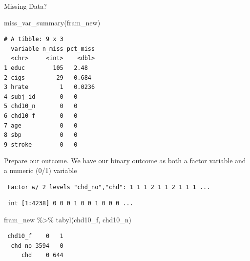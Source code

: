 \documentclass[
  ignorenonframetext,
]{beamer}
\newenvironment{Shaded}{\begin{snugshade}}{\end{snugshade}}
\newcommand{\FunctionTok}[1]{\textcolor[rgb]{0.00,0.00,0.00}{#1}}
\newcommand{\NormalTok}[1]{#1}
\newcommand{\SpecialCharTok}[1]{\textcolor[rgb]{0.00,0.00,0.00}{#1}}
\begin{document}
\begin{frame}[fragile]{Missing Data?}
\protect\hypertarget{missing-data}{}
\begin{Shaded}
\begin{Highlighting}[]
\FunctionTok{miss\_var\_summary}\NormalTok{(fram\_new)}
\end{Highlighting}
\end{Shaded}

\begin{verbatim}
# A tibble: 9 x 3
  variable n_miss pct_miss
  <chr>     <int>    <dbl>
1 educ        105   2.48  
2 cigs         29   0.684 
3 hrate         1   0.0236
4 subj_id       0   0     
5 chd10_n       0   0     
6 chd10_f       0   0     
7 age           0   0     
8 sbp           0   0     
9 stroke        0   0     
\end{verbatim}
\end{frame}

\begin{frame}[fragile]{Prepare our outcome.}
\protect\hypertarget{prepare-our-outcome.}{}
We have our binary outcome as both a factor variable and a numeric (0/1)
variable

\begin{Shaded}
\end{Shaded}

\begin{verbatim}
 Factor w/ 2 levels "chd_no","chd": 1 1 1 2 1 1 2 1 1 1 ...
\end{verbatim}

\begin{Shaded}
\end{Shaded}

\begin{verbatim}
 int [1:4238] 0 0 0 1 0 0 1 0 0 0 ...
\end{verbatim}

\begin{Shaded}
\begin{Highlighting}[]
\NormalTok{fram\_new }\SpecialCharTok{\%\textgreater{}\%} \FunctionTok{tabyl}\NormalTok{(chd10\_f, chd10\_n)}
\end{Highlighting}
\end{Shaded}

\begin{verbatim}
 chd10_f    0   1
  chd_no 3594   0
     chd    0 644
\end{verbatim}
\end{frame}
\end{document}
